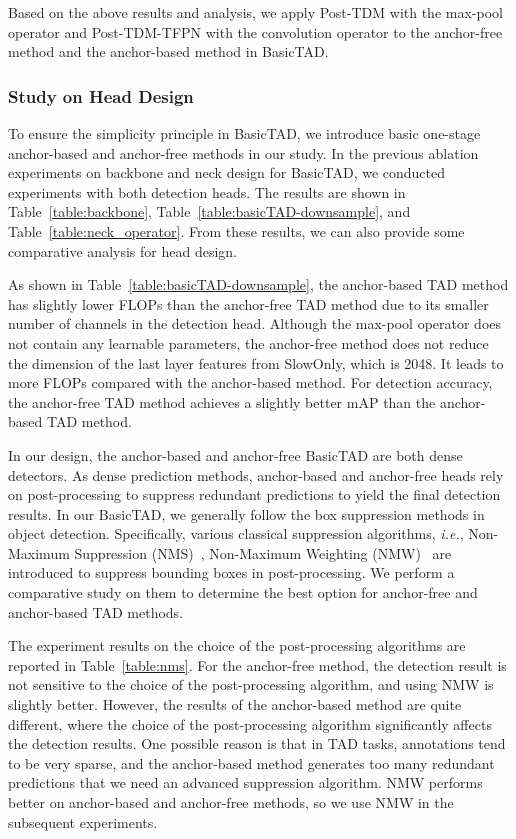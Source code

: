 \documentclass[a4paper,fleqn]{cas-dc}
\begin{document}
Based on the above results and analysis, we apply Post-TDM with the max-pool operator and Post-TDM-TFPN with the convolution operator to the anchor-free method and the anchor-based method in BasicTAD.



\noindent
\subsubsection{Study on Head Design} 
To ensure the simplicity principle in BasicTAD, we introduce basic one-stage anchor-based and anchor-free methods in our study.
In the previous ablation experiments on backbone and neck design for BasicTAD, we conducted experiments with both detection heads. The results are shown in Table~\ref{table:backbone}, Table~\ref{table:basicTAD-downsample}, and Table~\ref{table:neck_operator}. From these results, we can also provide some comparative analysis for head design.

As shown in Table~\ref{table:basicTAD-downsample}, the anchor-based TAD method has slightly lower FLOPs than the anchor-free TAD method due to its smaller number of channels in the detection head. Although the max-pool operator does not contain any learnable parameters, the anchor-free method does not reduce the dimension of the last layer features from SlowOnly, which is 2048. It leads to more FLOPs compared with the anchor-based method. For detection accuracy, the anchor-free TAD method achieves a slightly better mAP than the anchor-based TAD method.


In our design, the anchor-based and anchor-free BasicTAD are both dense detectors.
As dense prediction methods, anchor-based and anchor-free heads rely on post-processing to suppress redundant predictions to yield the final detection results.
In our BasicTAD, we generally follow the box suppression methods in object detection. Specifically, various classical  suppression algorithms, \emph{i.e.}, Non-Maximum Suppression (NMS)~\citep{nms}, Non-Maximum Weighting (NMW)~\citep{nmw} are introduced to suppress bounding boxes in post-processing. 
We perform a comparative study on them to determine the best option for anchor-free and anchor-based TAD methods.


The experiment results on the choice of the post-processing algorithms are reported in Table~\ref{table:nms}.
For the anchor-free method, the detection result is not sensitive to the choice of the post-processing algorithm, and using NMW is slightly better. 
However, the results of the anchor-based method are quite different, where the choice of the post-processing algorithm significantly affects the detection results.
One possible reason is that in TAD tasks, annotations tend to be very sparse, and the anchor-based method generates too many redundant predictions that we need an advanced suppression algorithm. 
NMW performs better on anchor-based and anchor-free methods, so we use NMW in the subsequent experiments.
\end{document}
